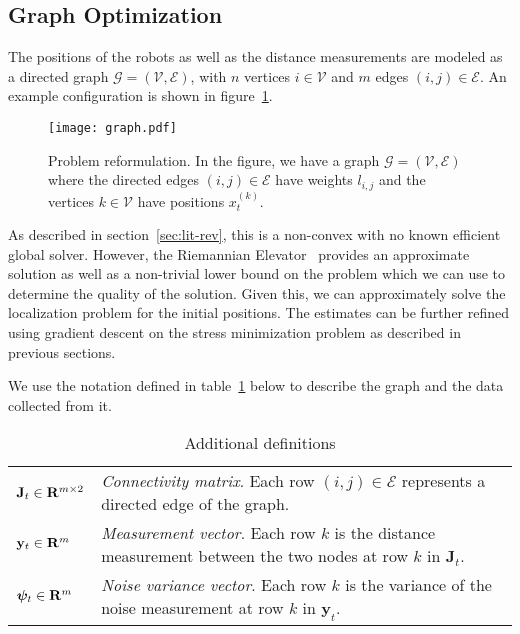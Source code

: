 \subsection{Graph Optimization} \label{sec:graphs}
The positions of the robots as well as the distance measurements are modeled as a directed graph $\mathcal{G} = (\mathcal{V}, \mathcal{E})$, with $n$ vertices $i \in \mathcal{V}$ and $m$ edges $(i, j) \in \mathcal{E}$. An example configuration is shown in figure~\ref{fig:problem-graph}.
\begin{figure}[ht]
    \centering
    \texttt{[image: graph.pdf]}
    \caption{Problem reformulation. In the figure, we have a graph $\mathcal{G}=(\mathcal{V}, \mathcal{E})$ where the directed edges $(i, j) \in \mathcal{E}$ have weights $l_{i,j}$ and the vertices $k \in \mathcal{V}$ have positions $x^{(k)}_t$.}
    \label{fig:problem-graph} 
\end{figure}
As described in section~\ref{sec:lit-rev}, this is a non-convex with no known efficient global solver. However, the Riemannian Elevator~\cite{R_elevator} provides an approximate solution as well as a non-trivial lower bound on the problem which we can use to determine the quality of the solution. Given this, we can approximately solve the localization problem for the initial positions. The estimates can be further refined using gradient descent on the stress minimization problem as described in previous sections. 

We use the notation defined in table~\ref{tab:notation} below to describe the graph and the data collected from it.
\FloatBarrier
\begin{table}[ht]
    \centering
    \caption{Additional definitions}
    \label{tab:notation}
    \begin{tabularx}{\linewidth}{lX}
        $\mathbf{J}_t \in \mathbf{R}^{m \times 2}$ & 
        \textit{Connectivity matrix}.  Each row $(i, j)\in\mathcal{E}$ represents a directed edge of the graph. \\
        $\mathbf{y}_t \in \mathbf{R}^{m}$ & 
        \textit{Measurement vector}. Each row $k$ is the distance measurement between the two nodes at row $k$ in $\mathbf{J}_t$. \\
        $\bm{\psi}_t \in \mathbf{R}^{m}$ &
        \textit{Noise variance vector}. Each row $k$ is the variance of the noise measurement at row $k$ in $\mathbf{y}_t$. 
    \end{tabularx}
\end{table}

